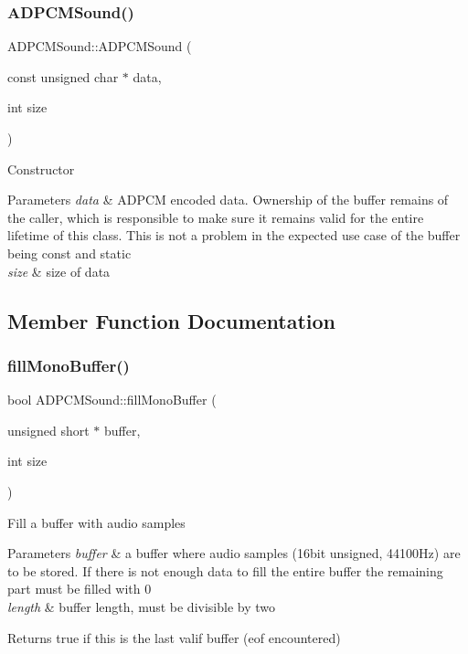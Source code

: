 \subsubsection{\texorpdfstring{A\+D\+P\+C\+M\+Sound()}{ADPCMSound()}}
{\footnotesize\ttfamily A\+D\+P\+C\+M\+Sound\+::\+A\+D\+P\+C\+M\+Sound (\begin{DoxyParamCaption}\item[{const unsigned char $\ast$}]{data,  }\item[{int}]{size }\end{DoxyParamCaption})\hspace{0.3cm}{\ttfamily [inline]}}

Constructor 
\begin{DoxyParams}{Parameters}
{\em data} & A\+D\+P\+CM encoded data. Ownership of the buffer remains of the caller, which is responsible to make sure it remains valid for the entire lifetime of this class. This is not a problem in the expected use case of the buffer being const and static \\
\hline
{\em size} & size of data \\
\hline
\end{DoxyParams}


\subsection{Member Function Documentation}
\mbox{\label{class_a_d_p_c_m_sound_aa4bae7530240f47b76abef5dee718649}} 
\subsubsection{\texorpdfstring{fill\+Mono\+Buffer()}{fillMonoBuffer()}}
{\footnotesize\ttfamily bool A\+D\+P\+C\+M\+Sound\+::fill\+Mono\+Buffer (\begin{DoxyParamCaption}\item[{unsigned short $\ast$}]{buffer,  }\item[{int}]{size }\end{DoxyParamCaption})\hspace{0.3cm}{\ttfamily [virtual]}}

Fill a buffer with audio samples 
\begin{DoxyParams}{Parameters}
{\em buffer} & a buffer where audio samples (16bit unsigned, 44100\+Hz) are to be stored. If there is not enough data to fill the entire buffer the remaining part must be filled with 0 \\
\hline
{\em length} & buffer length, must be divisible by two \\
\hline
\end{DoxyParams}
\begin{DoxyReturn}{Returns}
true if this is the last valif buffer (eof encountered) 
\end{DoxyReturn}


